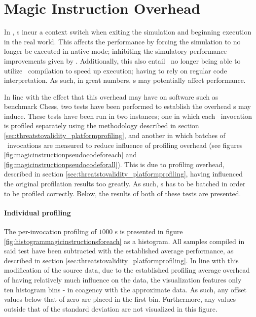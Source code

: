

\section{Magic Instruction Overhead}
\label{sec:results_magicinstructionoverhead}
In \dvttermsimics , \dvttermmagicinstruction s incur a context switch when exiting the simulation and beginning execution in the real world.
This affects the performance by forcing the simulation to no longer be executed in native mode; inhibiting the simulatory performance improvements given by \dvttermdirectvirtualization .
Additionally, this also entail \dvttermsimics\ no longer being able to utilize \dvttermjit\ compilation to speed up execution; having to rely on regular code interpretation.
As such, in great numbers, \dvttermmagicinstruction s may potentially affect performance. 



In line with the effect that this overhead may have on software such as benchmark Chess, two tests have been performed to establish the overhead \dvttermmagicinstruction s may induce.
These tests have been run in two instances; one in which each \dvttermmagicinstruction\ invocation is profiled separately using the methodology described in section \ref{sec:threatstovalidity_platformprofiling}, and another in which batches of \dvttermmagicinstruction\ invocations are measured to reduce influence of profiling overhead (see figures \ref{fig:magicinstructionpseudocodeforeach} and \ref{fig:magicinstructionpseudocodeforall}).
This is due to profiling overhead, described in section \ref{sec:threatstovalidity_platformprofiling}, having influenced the original profilation results too greatly.
As such, \dvttermmagicinstruction s has to be batched in order to be profiled correctly.
Below, the results of both of these tests are presented.

\paragraph{Individual profiling}
\label{par:results_magicinstructionoverhead_individualprofiling}
The per-invocation profiling of $1000$ \dvttermmagicinstruction s is presented in figure \ref{fig:histogrammagicinstructionsforeach} as a histogram.
All samples compiled in said test have been subtracted with the established average performance, as described in section \ref{sec:threatstovalidity_platformprofiling}.
In line with this modification of the source data, due to the established profiling average overhead of  having relatively much influence on the data, the visualization features only ten histogram bins - in coagency with the approximate data.
As such, any offset values below that of zero are placed in the first bin.
Furthermore, any values outside that of the standard deviation are not visualized in this figure.

